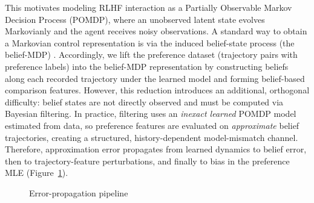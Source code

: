 \documentclass[10pt]{article} %
\theoremstyle{plain}
\theoremstyle{definition}
\theoremstyle{remark}
\begin{document}
This motivates modeling RLHF interaction as a Partially Observable Markov Decision Process (POMDP), where an unobserved latent state evolves Markovianly and the agent receives noisy observations. A standard way to obtain a Markovian control representation is via the induced belief-state process (the belief-MDP) \citep{Astrom1965, KAELBLING199899, Uesato2022}. Accordingly, we lift the preference dataset (trajectory pairs with preference labels) into the belief-MDP representation by constructing beliefs along each recorded trajectory under the learned model and forming belief-based comparison features. However, this reduction introduces an additional, orthogonal difficulty: belief states are not directly observed and must be computed via Bayesian filtering. In practice, filtering uses an \emph{inexact learned} POMDP model estimated from data, so preference features are evaluated on \emph{approximate} belief trajectories, creating a structured, history-dependent model-mismatch channel. Therefore, approximation error propagates from learned dynamics to belief error, then to trajectory-feature perturbations, and finally to bias in the preference MLE (Figure~\ref{fig:error-propagation-pipeline}).

\begin{figure}[H]
\centering
{}
\caption{Error-propagation pipeline}
\label{fig:error-propagation-pipeline}
\vspace{-0.6em}
\end{figure}
\end{document}
